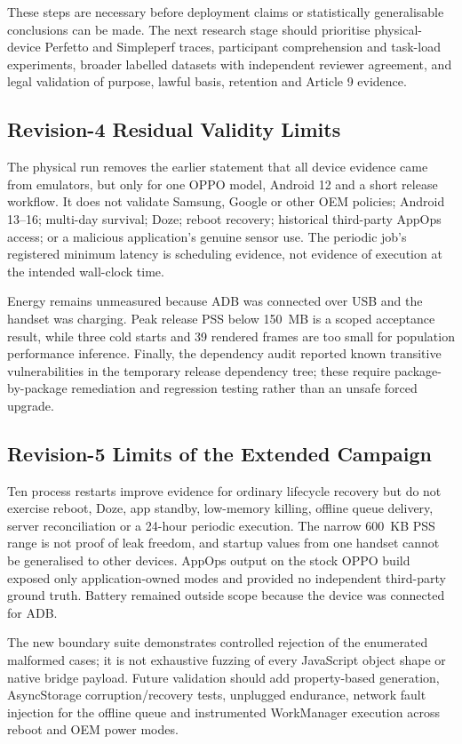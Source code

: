 These steps are necessary before deployment claims or statistically generalisable conclusions can be made. The next research stage should prioritise physical-device Perfetto and Simpleperf traces, participant comprehension and task-load experiments, broader labelled datasets with independent reviewer agreement, and legal validation of purpose, lawful basis, retention and Article 9 evidence.
\subsection{Revision-4 Residual Validity Limits}

The physical run removes the earlier statement that all device evidence came from emulators, but only for one OPPO model, Android 12 and a short release workflow. It does not validate Samsung, Google or other OEM policies; Android 13--16; multi-day survival; Doze; reboot recovery; historical third-party AppOps access; or a malicious application's genuine sensor use. The periodic job's registered minimum latency is scheduling evidence, not evidence of execution at the intended wall-clock time.

Energy remains unmeasured because ADB was connected over USB and the handset was charging. Peak release PSS below 150~MB is a scoped acceptance result, while three cold starts and 39 rendered frames are too small for population performance inference. Finally, the dependency audit reported known transitive vulnerabilities in the temporary release dependency tree; these require package-by-package remediation and regression testing rather than an unsafe forced upgrade.
\subsection{Revision-5 Limits of the Extended Campaign}

Ten process restarts improve evidence for ordinary lifecycle recovery but do not exercise reboot, Doze, app standby, low-memory killing, offline queue delivery, server reconciliation or a 24-hour periodic execution. The narrow 600~KB PSS range is not proof of leak freedom, and startup values from one handset cannot be generalised to other devices. AppOps output on the stock OPPO build exposed only application-owned modes and provided no independent third-party ground truth. Battery remained outside scope because the device was connected for ADB.

The new boundary suite demonstrates controlled rejection of the enumerated malformed cases; it is not exhaustive fuzzing of every JavaScript object shape or native bridge payload. Future validation should add property-based generation, AsyncStorage corruption/recovery tests, unplugged endurance, network fault injection for the offline queue and instrumented WorkManager execution across reboot and OEM power modes.
